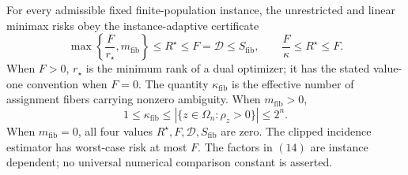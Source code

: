 For every admissible fixed finite-population instance, the unrestricted and linear minimax risks obey the instance-adaptive certificate
\[
 \max\left\{\frac{F}{r_{\star}},m_{\mathrm{fib}}\right\}
 \le R^{\star}\le F=\mathcal D\le S_{\mathrm{fib}},
 \qquad
 \frac{F}{\kappa}\le R^{\star}\le F.                                            \tag{14}
\]
When \(F>0\), \(r_{\star}\) is the minimum rank of a dual optimizer; it has the stated value-one convention when \(F=0\).  The quantity \(\kappa_{\mathrm{fib}}\) is the effective number of assignment fibers carrying nonzero ambiguity.  When \(m_{\mathrm{fib}}>0\),
\[
 1\le\kappa_{\mathrm{fib}}
 \le\left\lvert\{z\in\Omega_n:\rho_z>0\}\right\rvert
 \le2^n.
\]
When \(m_{\mathrm{fib}}=0\), all four values \(R^{\star},F,\mathcal D,S_{\mathrm{fib}}\) are zero.  The clipped incidence estimator has worst-case risk at most \(F\).  The factors in \((14)\) are instance dependent; no universal numerical comparison constant is asserted.